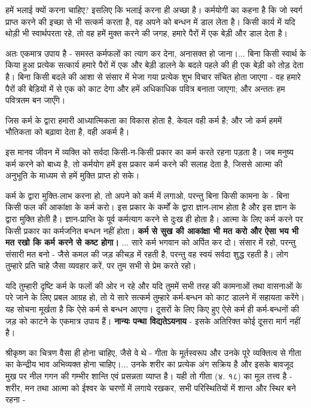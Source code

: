 हमें भलाई क्यों करना चाहिए? इसलिए कि भलाई करना ही अच्छा है। कर्मयोगी का कहना है कि जो स्वर्ग प्राप्त करने की इच्छा से भी सत्कर्म करता है, वह अपने को बन्धन में डाल लेता है। किसी कार्य में यदि थोड़ी भी स्वार्थपरता रहे, तो वह हमें मुक्त करने की जगह, हमारे पैरों में एक बेड़ी और डाल देता है। 

अतः एकमात्र उपाय है - समस्त कर्मफलों का त्याग कर देना, अनासक्त हो जाना।... बिना किसी स्वार्थ के किया हुआ प्रत्येक सत्कार्य हमारे पैरों में एक और बेड़ी डालने के बदले पहले की ही एक बेड़ी को तोड़ देता है। बिना किसी बदले की आशा से संसार में भेजा गया प्रत्येक शुभ विचार संचित होता जाएगा - वह हमारे पैरों की बेड़ियों में से एक को काट देगा और हमें अधिकाधिक पवित्र बनाता जाएगा; और अन्ततः हम पवित्रतम बन जाएँगे। 

जिस कर्म के द्वारा हमारी आध्यात्मिकता का विकास होता है, केवल वही कर्म है; और जो कर्म हममें भौतिकता को बढ़ावा देता है, वही अकर्म है। 

इस मानव जीवन में व्यक्ति को सर्वदा किसी-न-किसी प्रकार का कर्म करते रहना पड़ता है। जब मनुष्य कर्म करने को बाध्य है, तो कर्मयोग हमें इस प्रकार कर्म करने की सलाह देता है, जिससे आत्मा की अनुभूति के माध्यम से हमें मुक्ति प्राप्त हो सके। 

कर्म के द्वारा मुक्ति-लाभ करना हो, तो अपने को कर्म में लगाओ, परन्तु बिना किसी कामना के - बिना किसी फल की आकांक्षा के कर्म करो। इस प्रकार के कर्मों के द्वारा ज्ञान-लाभ होता है और इस ज्ञान के द्वारा मुक्ति होती है। ज्ञान-प्राप्ति के पूर्व कर्मत्याग करने से दुःख ही होता है। आत्मा के लिए कर्म करने पर किसी प्रकार का कर्मजनित बन्धन नहीं होता। \textbf{कर्म से सुख की आकांक्षा भी मत करो और ऐसा भय भी मत रखो कि कर्म करने से कष्ट होगा। }... सारे कर्म भगवान को अर्पित कर दो। संसार में रहो, परन्तु संसारी मत बनो - जैसे कमल की जड़ कीचड़ में रहती है, परन्तु वह स्वयं सर्वदा शुद्ध रहती है। लोग तुम्हारे प्रति चाहे जैसा व्यवहार करें, पर तुम सभी से प्रेम करते रहो। 

यदि तुम्हारी दृष्टि कर्म के फलों की ओर न रहे और यदि तुममें सभी तरह की कामनाओं तथा वासनाओं के परे जाने के लिए प्रबल आग्रह हो, तो ये सारे सत्कर्म तुम्हारे कर्म-बन्धन को काट डालने में सहायता करेंगे। यह सोचना मूर्खता है कि ऐसे कर्म से बन्धन आएगा। दूसरों के लिए किए हुए ऐसे कर्म ही कर्म-बन्धनों की जड़ को काटने के एकमात्र उपाय हैं। \textbf{नान्यः पन्था विद्यतेऽयनाय } - इसके अतिरिक्त कोई दूसरा मार्ग नहीं है। 

श्रीकृष्ण का चित्रण वैसा ही होना चाहिए, जैसे वे थे - गीता के मूर्तस्वरूप और उनके पूरे व्यक्तित्व से गीता का केन्द्रीय भाव अभिव्यक्त होना चाहिए।... उनके शरीर का प्रत्येक अंग सक्रिय है और इसके बावजूद मुख पर नील गगन की गम्भीर शान्ति एवं प्रसन्नता व्याप्त है। यही तो गीता (४. १८) का मूल तत्त्व है - शरीर, मन तथा आत्मा को ईश्वर के चरणों में लगाये रखकर, सभी परिस्थितियों में शान्त और स्थिर बने रहना -

